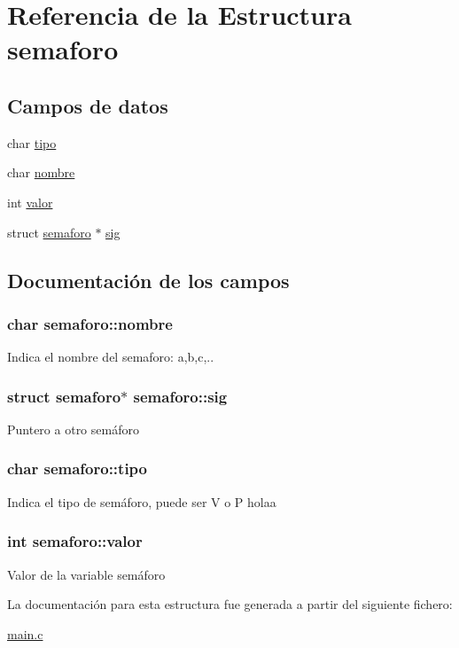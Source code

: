 \hypertarget{structsemaforo}{\section{Referencia de la Estructura semaforo}
\label{structsemaforo}
}
\subsection*{Campos de datos}
\begin{DoxyCompactItemize}
\item 
char \hyperlink{structsemaforo_af739620755b50d7b8333a5bd6bf2a630}{tipo}
\item 
char \hyperlink{structsemaforo_a49fad9e77532b837892f6d051a0c1dbd}{nombre}
\item 
int \hyperlink{structsemaforo_a58fabb8c7e1558362c0cd4bf64219413}{valor}
\item 
struct \hyperlink{structsemaforo}{semaforo} $\ast$ \hyperlink{structsemaforo_a23ae50a7e6f194c59cb998b434fad7f7}{sig}
\end{DoxyCompactItemize}


\subsection{Documentación de los campos}
\hypertarget{structsemaforo_a49fad9e77532b837892f6d051a0c1dbd}{
\subsubsection[{nombre}]{\setlength{\rightskip}{0pt plus 5cm}char semaforo\-::nombre}}\label{structsemaforo_a49fad9e77532b837892f6d051a0c1dbd}
Indica el nombre del semaforo\-: a,b,c,.. \hypertarget{structsemaforo_a23ae50a7e6f194c59cb998b434fad7f7}{
\subsubsection[{sig}]{\setlength{\rightskip}{0pt plus 5cm}struct {\bf semaforo}$\ast$ semaforo\-::sig}}\label{structsemaforo_a23ae50a7e6f194c59cb998b434fad7f7}
Puntero a otro semáforo \hypertarget{structsemaforo_af739620755b50d7b8333a5bd6bf2a630}{
\subsubsection[{tipo}]{\setlength{\rightskip}{0pt plus 5cm}char semaforo\-::tipo}}\label{structsemaforo_af739620755b50d7b8333a5bd6bf2a630}
Indica el tipo de semáforo, puede ser V o P holaa \hypertarget{structsemaforo_a58fabb8c7e1558362c0cd4bf64219413}{
\subsubsection[{valor}]{\setlength{\rightskip}{0pt plus 5cm}int semaforo\-::valor}}\label{structsemaforo_a58fabb8c7e1558362c0cd4bf64219413}
Valor de la variable semáforo 

La documentación para esta estructura fue generada a partir del siguiente fichero\-:\begin{DoxyCompactItemize}
\item 
\hyperlink{main_8c}{main.\-c}\end{DoxyCompactItemize}
